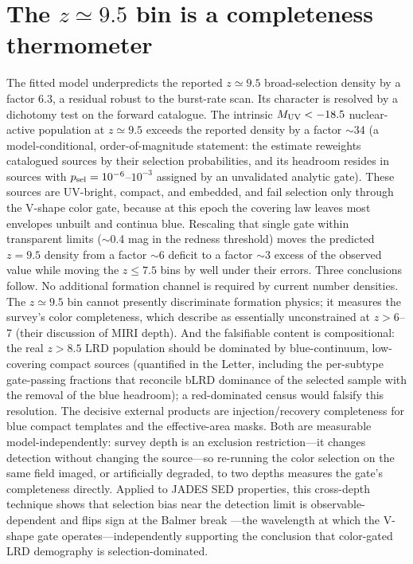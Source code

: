 \documentclass[twocolumn]{aastex631}
\begin{document}
\section{The $z\simeq9.5$ bin is a completeness thermometer}
\label{sec:highz}
The fitted model underpredicts the reported $z\simeq9.5$ broad-selection
density by a factor 6.3, a residual robust to the burst-rate scan. Its
character is resolved by a dichotomy test on the forward catalogue. The
intrinsic $M_{\rm UV}<-18.5$ nuclear-active population at $z\simeq9.5$
exceeds the reported density by a factor $\sim$34 (a model-conditional,
order-of-magnitude statement: the estimate reweights catalogued sources
by their selection probabilities, and its headroom resides in sources
with $p_{\rm sel}=10^{-6}$--$10^{-3}$ assigned by an unvalidated analytic
gate). These sources are UV-bright, compact, and embedded, and fail
selection only through the V-shape color gate, because at this epoch the
covering law leaves most envelopes unbuilt and continua blue. Rescaling
that single gate within transparent limits ($\sim$0.4 mag in the redness
threshold) moves the predicted $z=9.5$ density from a factor $\sim$6
deficit to a factor $\sim$3 excess of the observed value while moving the
$z\le7.5$ bins by well under their errors. Three conclusions follow. No
additional formation channel is required by current number densities. The
$z\simeq9.5$ bin cannot presently discriminate formation physics; it
measures the survey's color completeness, which \citet{Rinaldi2026}
describe as essentially unconstrained at $z>6$--7 (their discussion of
MIRI depth). And the falsifiable content is compositional: the real
$z>8.5$ LRD population should be dominated by blue-continuum,
low-covering compact sources (quantified in the Letter, including the
per-subtype gate-passing fractions that reconcile bLRD dominance of the
selected sample with the removal of the blue headroom); a red-dominated
census would falsify this resolution. The decisive external products are
injection/recovery completeness for blue compact templates and the
effective-area masks. Both are measurable model-independently: survey
depth is an exclusion restriction---it changes detection without changing
the source---so re-running the color selection on the same field imaged,
or artificially degraded, to two depths measures the gate's completeness
directly. Applied to JADES SED properties, this cross-depth technique
shows that selection bias near the detection limit is observable-dependent
and flips sign at the Balmer break \citep{PandevXDC}---the wavelength at
which the V-shape gate operates---independently supporting the conclusion
that color-gated LRD demography is selection-dominated.
\end{document}
